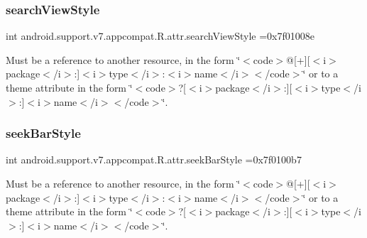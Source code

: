 \subsubsection{\texorpdfstring{search\+View\+Style}{searchViewStyle}}
{\footnotesize\ttfamily int android.\+support.\+v7.\+appcompat.\+R.\+attr.\+search\+View\+Style =0x7f01008e\hspace{0.3cm}{\ttfamily [static]}}

Must be a reference to another resource, in the form \char`\"{}$<$code$>$@\mbox{[}+\mbox{]}\mbox{[}$<$i$>$package$<$/i$>$\+:\mbox{]}$<$i$>$type$<$/i$>$\+:$<$i$>$name$<$/i$>$$<$/code$>$\char`\"{} or to a theme attribute in the form \char`\"{}$<$code$>$?\mbox{[}$<$i$>$package$<$/i$>$\+:\mbox{]}\mbox{[}$<$i$>$type$<$/i$>$\+:\mbox{]}$<$i$>$name$<$/i$>$$<$/code$>$\char`\"{}. \mbox{\label{classandroid_1_1support_1_1v7_1_1appcompat_1_1R_1_1attr_aaa05c0c5eafda565ce4da73a3b31958c}} 
\subsubsection{\texorpdfstring{seek\+Bar\+Style}{seekBarStyle}}
{\footnotesize\ttfamily int android.\+support.\+v7.\+appcompat.\+R.\+attr.\+seek\+Bar\+Style =0x7f0100b7\hspace{0.3cm}{\ttfamily [static]}}

Must be a reference to another resource, in the form \char`\"{}$<$code$>$@\mbox{[}+\mbox{]}\mbox{[}$<$i$>$package$<$/i$>$\+:\mbox{]}$<$i$>$type$<$/i$>$\+:$<$i$>$name$<$/i$>$$<$/code$>$\char`\"{} or to a theme attribute in the form \char`\"{}$<$code$>$?\mbox{[}$<$i$>$package$<$/i$>$\+:\mbox{]}\mbox{[}$<$i$>$type$<$/i$>$\+:\mbox{]}$<$i$>$name$<$/i$>$$<$/code$>$\char`\"{}. \mbox{\label{classandroid_1_1support_1_1v7_1_1appcompat_1_1R_1_1attr_a87c474abcdf634b03663abfe1d1ad911}} 
